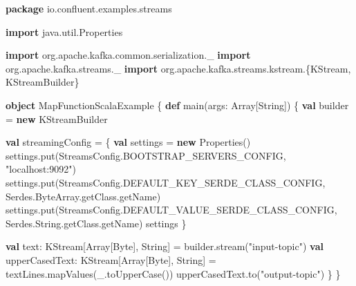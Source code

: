 \documentclass[]{article}
\newenvironment{Shaded}{}{}
\newcommand{\KeywordTok}[1]{\textcolor[rgb]{0.00,0.44,0.13}{\textbf{#1}}}
\newcommand{\StringTok}[1]{\textcolor[rgb]{0.25,0.44,0.63}{#1}}
\newcommand{\FunctionTok}[1]{\textcolor[rgb]{0.02,0.16,0.49}{#1}}
\newcommand{\NormalTok}[1]{#1}
\begin{document}
\begin{Shaded}
\begin{Highlighting}[]
\KeywordTok{package}\NormalTok{ io.}\FunctionTok{confluent}\NormalTok{.}\FunctionTok{examples}\NormalTok{.}\FunctionTok{streams}

\KeywordTok{import}\NormalTok{ java.}\FunctionTok{util}\NormalTok{.}\FunctionTok{Properties}

\KeywordTok{import}\NormalTok{ org.}\FunctionTok{apache}\NormalTok{.}\FunctionTok{kafka}\NormalTok{.}\FunctionTok{common}\NormalTok{.}\FunctionTok{serialization}\NormalTok{._}
\KeywordTok{import}\NormalTok{ org.}\FunctionTok{apache}\NormalTok{.}\FunctionTok{kafka}\NormalTok{.}\FunctionTok{streams}\NormalTok{._}
\KeywordTok{import}\NormalTok{ org.}\FunctionTok{apache}\NormalTok{.}\FunctionTok{kafka}\NormalTok{.}\FunctionTok{streams}\NormalTok{.}\FunctionTok{kstream}\NormalTok{.\{KStream, KStreamBuilder\}}

\KeywordTok{object}\NormalTok{ MapFunctionScalaExample \{}
  \KeywordTok{def} \FunctionTok{main}\NormalTok{(args: Array[String]) \{}
    \KeywordTok{val}\NormalTok{ builder = }\KeywordTok{new}\NormalTok{ KStreamBuilder}

    \KeywordTok{val}\NormalTok{ streamingConfig = \{}
      \KeywordTok{val}\NormalTok{ settings = }\KeywordTok{new}\NormalTok{ Properties()}
\NormalTok{      settings.}\FunctionTok{put}\NormalTok{(StreamsConfig.}\FunctionTok{BOOTSTRAP_SERVERS_CONFIG}\NormalTok{, }\StringTok{"localhost:9092"}\NormalTok{)}
\NormalTok{      settings.}\FunctionTok{put}\NormalTok{(StreamsConfig.}\FunctionTok{DEFAULT_KEY_SERDE_CLASS_CONFIG}\NormalTok{, }
\NormalTok{                    Serdes.}\FunctionTok{ByteArray}\NormalTok{.}\FunctionTok{getClass}\NormalTok{.}\FunctionTok{getName}\NormalTok{)}
\NormalTok{      settings.}\FunctionTok{put}\NormalTok{(StreamsConfig.}\FunctionTok{DEFAULT_VALUE_SERDE_CLASS_CONFIG}\NormalTok{, }
\NormalTok{                    Serdes.}\FunctionTok{String}\NormalTok{.}\FunctionTok{getClass}\NormalTok{.}\FunctionTok{getName}\NormalTok{)}
\NormalTok{      settings}
\NormalTok{    \}}

    \KeywordTok{val}\NormalTok{ text: KStream[Array[Byte], String] = builder.}\FunctionTok{stream}\NormalTok{(}\StringTok{"input-topic"}\NormalTok{)}
    \KeywordTok{val}\NormalTok{ upperCasedText: KStream[Array[Byte], String] = textLines.}\FunctionTok{mapValues}\NormalTok{(_.}\FunctionTok{toUpperCase}\NormalTok{())}
\NormalTok{    upperCasedText.}\FunctionTok{to}\NormalTok{(}\StringTok{"output-topic"}\NormalTok{)}
\NormalTok{  \}}
\NormalTok{\}}
\end{Highlighting}
\end{Shaded}
\end{document}
